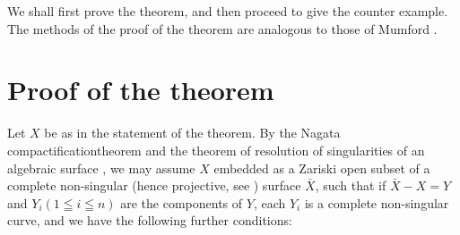 We shall first prove the theorem, and then proceed to give the counter example. The methods of the proof of the theorem are analogous to those of Mumford \cite{art8-key2}.

\section{Proof of the theorem}\label{art8-sec2}%
Let $X$ be as in the statement of the theorem. By the Nagata compactification\pageoriginale  theorem \cite{art8-key3} and the theorem of resolution of singularities of an algebraic surface \cite{art8-key1}, we may assume $X$ embedded as a Zariski open subset of a complete non-singular (hence projective, see \cite{art8-key4}) surface $\bar{X}$, such that if $\bar{X} - X = Y$ and $Y_i (1 \leqq i \leqq n)$ are the components of $Y$, each $Y_i$ is a complete non-singular curve, and we have  the following further conditions:
